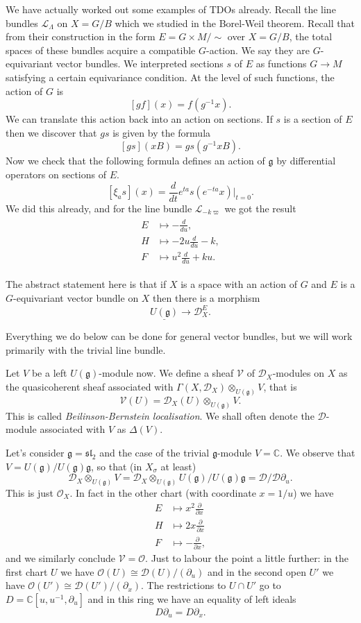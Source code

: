 \documentclass[12pt]{article}
\theoremstyle{plain}
\theoremstyle{definition}
\numberwithin{equation}{section}
\newcommand{\V}{\mathcal{V}}
\newcommand{\D}{\Delta}
\newcommand{\C}{\mathbb{C}}
\newcommand{\g}{\mathfrak{g}}
\newcommand{\sll}{\mathfrak{sl}}
\newcommand{\CD}{\mathcal{D}}
\newcommand{\CL}{\mathcal{L}}
\newcommand{\CV}{\mathcal{V}}
\newcommand{\OO}{\mathcal{O}}
\begin{document}
We have actually worked out some examples of TDOs already. Recall the line bundles $\CL_\Lambda$ on $X = G / B$ which we studied in the Borel-Weil theorem. Recall that from their construction in the form $E = G \times M / \sim$ over $X = G / B$, the total spaces of these bundles acquire a compatible $G$-action. We say they are $G$-equivariant vector bundles. We interpreted sections $s$ of $E$ as functions $G \rightarrow M$ satisfying a certain equivariance condition. At the level of such functions, the action of $G$ is
\[
[g f](x) = f(g^{-1}x).
\]
We can translate this action back into an action on sections. If $s$ is a section of $E$ then we discover that $g s$ is given by the formula
\[
[g s](xB) = g s(g^{-1} xB).
\]
Now we check that the following formula defines an action of $\g$ by differential operators on sections of $E$.
\[
[\xi_a s](x) = \frac{d}{dt} e^{ta} s(e^{-ta} x)|_{t=0}.
\]
We did this already, and for the line bundle $\CL_{-k\varpi}$ we got the result
\begin{align}\label{eq:TDO}
\begin{split}
E &\mapsto -\frac{d}{du}, \\
%
H &\mapsto -2u \frac{d}{du} - k, \\
%
F &\mapsto u^2 \frac{d}{du} + ku.
\end{split}
\end{align}

The abstract statement here is that if $X$ is a space with an action of $G$ and $E$ is a $G$-equivariant vector bundle on $X$ then there is a morphism
\[
\underline{U(\g)} \rightarrow \CD_X^E.
\]

Everything we do below can be done for general vector bundles, but we will work primarily with the trivial line bundle.

Let $V$ be a left $U(\g)$-module now. We define a sheaf $\CV$ of $\CD_X$-modules on $X$ as the quasicoherent sheaf associated with $\Gamma(X, \CD_X) \otimes_{U(\g)} V$, that is
\[
\V(U) = \CD_X(U) \otimes_{U(\g)} V.
\]
This is called \emph{Beilinson-Bernstein localisation}. We shall often denote the $\CD$-module associated with $V$ as $\D(V)$.

Let's consider $\g = \sll_2$ and the case of the trivial $\g$-module $V = \C$. We observe that $V = U(\g) / U(\g)\g$, so that (in $X_\sigma$ at least)
\[
\CD_X \otimes_{U(\g)} V = \CD_X \otimes_{U(\g)} U(\g) / U(\g) \g = \CD / \CD \partial_u.
\]
This is just $\OO_X$. In fact in the other chart (with coordinate $x = 1/u$) we have
\begin{align*}
E &\mapsto x^2 \frac{\partial}{\partial x} \\
%
H &\mapsto 2 x \frac{\partial}{\partial x} \\
%
F &\mapsto -\frac{\partial}{\partial x},
\end{align*}
and we similarly conclude $\CV = \OO$. Just to labour the point a little further: in the first chart $U$ we have $\OO(U) \cong \CD(U) / (\partial_u)$ and in the second open $U'$ we have $\OO(U') \cong \CD(U') / (\partial_x)$. The restrictions to $U \cap U'$ go to $D = \C[u, u^{-1}, \partial_u]$ and in this ring we have an equality of left ideals
\[
D \partial_u = D \partial_x.
\]
\end{document}
